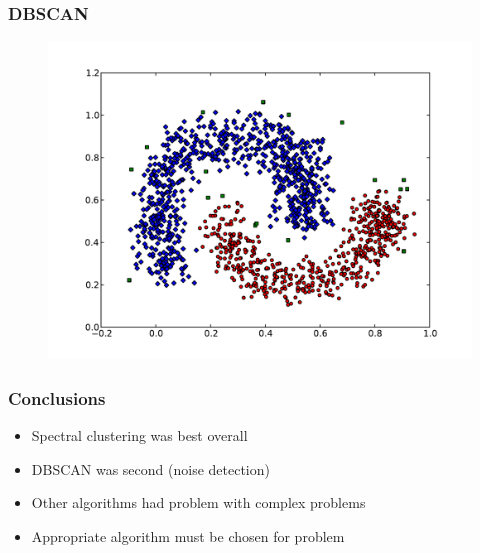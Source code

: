 \documentclass{beamer}
\begin{document}
\begin{frame}
\frametitle{DBSCAN}
    \begin{figure}[]
    \includegraphics[scale=0.3]{dbscan_half-moons.pdf}
    \end{figure}
\end{frame}


\begin{frame}
\frametitle{Conclusions}
    \begin{itemize}
	\item Spectral clustering was best overall
    	\item DBSCAN was second (noise detection)
	\item Other algorithms had problem with complex problems

   	\item Appropriate algorithm must be chosen for problem
    \end{itemize}
\end{frame}
\end{document}
